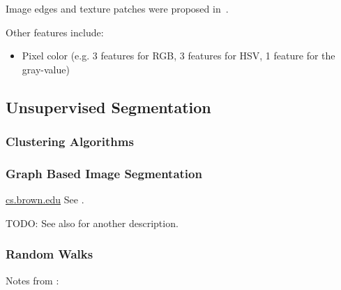 Image edges and texture patches were proposed in~\cite{brox2011object}.

Other features include:

\begin{itemize}
    \item Pixel color (e.g. 3 features for RGB, 3 features for HSV, 1 feature
          for the gray-value)
\end{itemize}


\subsection{Unsupervised Segmentation}%
\label{subsec:unsupervised-traditional-segmentation}%

\subsubsection{Clustering Algorithms}
%




\subsubsection{Graph Based Image Segmentation}%
\label{subsec:graph-based-image-segmentation}%
\href{http://cs.brown.edu/~pff/segment/}{cs.brown.edu}
See \cite{felzenszwalb2004efficient}.

TODO: See also \cite{pantofaru2005comparison} for another description.


\subsubsection{Random Walks}
Notes from \cite{meilpa2001learning}:

